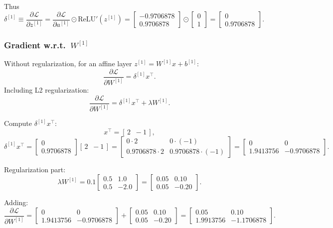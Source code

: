 \documentclass{article}
\begin{document}
Thus
\[
\delta^{[1]} \equiv
\frac{\partial\mathcal{L}}{\partial z^{[1]}}
=
\frac{\partial\mathcal{L}}{\partial a^{[1]}}
\odot \mathrm{ReLU}'(z^{[1]})
=
\begin{bmatrix}
-0.9706878\\
0.9706878
\end{bmatrix}
\odot
\begin{bmatrix}
0\\
1
\end{bmatrix}
=
\begin{bmatrix}
0\\
0.9706878
\end{bmatrix}.
\]

\subsubsection*{Gradient w.r.t.\ $W^{[1]}$}

Without regularization, for an affine layer $z^{[1]} = W^{[1]}x + b^{[1]}$:
\[
\frac{\partial\mathcal{L}}{\partial W^{[1]}} = \delta^{[1]} x^\top.
\]
Including L2 regularization:
\[
\frac{\partial\mathcal{L}}{\partial W^{[1]}}
= \delta^{[1]} x^\top + \lambda W^{[1]}.
\]

Compute $\delta^{[1]} x^\top$:
\[
x^\top = [\,2\;\; -1\,],
\]
\[
\delta^{[1]} x^\top =
\begin{bmatrix}
0\\
0.9706878
\end{bmatrix}
[\,2\;\; -1\,]
=
\begin{bmatrix}
0\cdot 2 & 0\cdot(-1)\\
0.9706878\cdot 2 & 0.9706878\cdot(-1)
\end{bmatrix}
=
\begin{bmatrix}
0 & 0\\
1.9413756 & -0.9706878
\end{bmatrix}.
\]

Regularization part:
\[
\lambda W^{[1]} = 0.1
\begin{bmatrix}
0.5 & 1.0\\
0.5 & -2.0
\end{bmatrix}
=
\begin{bmatrix}
0.05 & 0.10\\
0.05 & -0.20
\end{bmatrix}.
\]

Adding:
\[
\frac{\partial\mathcal{L}}{\partial W^{[1]}}
=
\begin{bmatrix}
0 & 0\\
1.9413756 & -0.9706878
\end{bmatrix}
+
\begin{bmatrix}
0.05 & 0.10\\
0.05 & -0.20
\end{bmatrix}
=
\begin{bmatrix}
0.05 & 0.10\\
1.9913756 & -1.1706878
\end{bmatrix}.
\]
\end{document}
